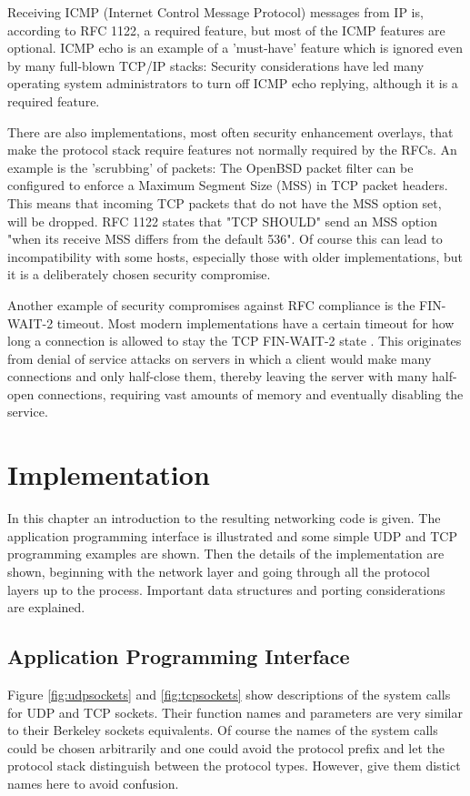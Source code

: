 \documentclass[11pt,twoside,abstract,notitlepage]{scrreprt}
\begin{document}
Receiving ICMP (Internet Control Message Protocol) messages from IP is, according to RFC 1122, a required feature, but most of the ICMP features are optional. ICMP echo is an example of a 'must-have' feature which is ignored even by many full-blown TCP/IP stacks: Security considerations have led many operating system administrators to turn off ICMP echo replying, although it is a required feature. 

There are also implementations, most often security enhancement overlays, that make the protocol stack require features not normally required by the RFCs. An example is the 'scrubbing' of packets: The OpenBSD packet filter can be configured to enforce a Maximum Segment Size (MSS) in TCP packet headers. This means that incoming TCP packets that do not have the MSS option set, will be dropped. RFC 1122 states that "TCP SHOULD" send an MSS option "when its receive MSS differs from the default 536". Of course this can lead to incompatibility with some hosts, especially those with older implementations, but it is a deliberately chosen security compromise. 

Another example of security compromises against RFC compliance is the FIN-WAIT-2 timeout. Most modern implementations have a certain timeout for how long a connection is allowed to stay the TCP FIN-WAIT-2 state \cite{finwait2}. This originates from denial of service attacks on servers in which a client would make many connections and only half-close them, thereby leaving the server with many half-open connections, requiring vast amounts of memory and eventually disabling the service. 


\chapter{Implementation} 
In this chapter an introduction to the resulting networking code is given. The application programming interface is illustrated and some simple UDP and TCP programming examples are shown. Then the details of the implementation are shown, beginning with the network layer and going through all the protocol layers up to the process. Important data structures and porting considerations are explained.

\section{Application Programming Interface}
Figure \ref{fig:udpsockets} and \ref{fig:tcpsockets} show descriptions of the system calls for UDP and TCP sockets. Their function names and parameters are very similar to their Berkeley sockets equivalents. Of course the names of the system calls could be chosen arbitrarily and one could avoid the protocol prefix and let the protocol stack distinguish between the protocol types. However, give them distict names here to avoid confusion.
\end{document}
